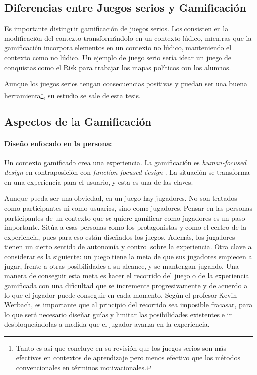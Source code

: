 \subsection{Diferencias entre Juegos serios y Gamificación}

Es importante distinguir gamificación de juegos serios. Los  consisten en la modificación del contexto transformándolo en un contexto lúdico, mientras que la gamificación incorpora elementos en un contexto no lúdico, manteniendo el contexto como no lúdico.
%
Un ejemplo de juego serio sería idear un juego de conquistas como el Risk para trabajar los mapas políticos con los alumnos. 

Aunque los juegos serios tengan consecuencias positivas y puedan ser una buena herramienta\footnote{Tanto es así que \cite{MetaSerious} concluye en su revisión que los juegos serios son más efectivos en contextos de aprendizaje pero menos efectivo que los métodos convencionales en términos motivacionales.}, su estudio se sale de esta tesis.

\subsection{Aspectos de la Gamificación}

\paragraph{Diseño enfocado en la persona:} 
Un contexto gamificado crea una experiencia.
%
La gamificación es \textit{human-focused design} en contraposición con \textit{function-focused design} \cite{BeyondPBL}.
%
La situación se transforma en una experiencia para el usuario, y esta es una de las claves.

Aunque pueda ser una obviedad, en un juego hay jugadores. No son tratados como participantes ni como usuarios, sino como jugadores.
%
Pensar en las personas participantes de un contexto que se quiere gamificar como jugadores es un paso importante.
%
Sitúa a esas personas como los protagonistas y como el centro de la experiencia, pues para eso están diseñados los juegos.
%
Además, los jugadores tienen un cierto sentido de autonomía y control sobre la experiencia.
%
Otra clave a considerar es la siguiente: un juego tiene la meta de que sus jugadores empiecen a jugar, frente a otras posibilidades a su alcance, y se mantengan jugando.
%
Una manera de conseguir esta meta es hacer el recorrido del juego o de la experiencia gamificada con una dificultad que se incremente progresivamente y de acuerdo a lo que el jugador puede conseguir en cada momento. 
%
Según el profesor Kevin Werbach, es importante que al principio del recorrido sea imposible fracasar, para lo que será necesario diseñar guías y limitar las posibilidades existentes e ir desbloqueándolas a medida que el jugador avanza en la experiencia.



